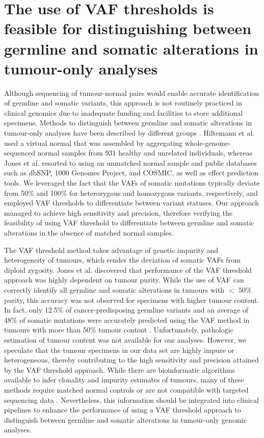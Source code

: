 \section{The use of VAF thresholds is feasible for distinguishing between germline and somatic alterations in tumour-only analyses}
\label{sec:TheuseofVAFthresholdsisfeasiblefordistinguishingbetweengermlineandsomaticalterationsintumour-onlyanalyses}

Although sequencing of tumour-normal pairs would enable accurate identification of germline and somatic variants, this approach is not routinely practiced in clinical genomics due to inadequate funding and facilities to store additional specimens. Methods to distinguish between germline and somatic alterations in tumour-only analyses have been described by different groups \cite{Hiltemann2015, Jones2015a, Garofalo2016}. Hiltemann et al. \cite{Hiltemann2015} used a virtual normal that was assembled by aggregating whole-genome-sequenced normal samples from 931 healthy and unrelated individuals, whereas Jones et al. \cite{Jones2015a} resorted to using an unmatched normal sample and public databases such as dbSNP, 1000 Genomes Project, and COSMIC, as well as effect prediction tools. We leveraged the fact that the VAFs of somatic mutations typically deviate from 50\% and 100\% for heterozygous and homozygous variants, respectively, and employed VAF thresholds to differentiate between variant statuses. Our approach managed to achieve high sensitivity and precision, therefore verifying the feasibility of using VAF threshold to differentiate between germline and somatic alterations in the absence of matched normal samples.

The VAF threshold method takes advantage of genetic impurity and heterogeneity of tumours, which render the deviation of somatic VAFs from diploid zygosity. Jones et al. \cite{Jones2015a} discovered that performance of the VAF threshold approach was highly dependent on tumour purity. While the use of VAF can correctly identify all germline and somatic alterations in tumours with $<$ 50\% purity, this accuracy was not observed for specimens with higher tumour content. In fact, only 12.5\% of cancer-predisposing germline variants and an average of 48\% of somatic mutations were accurately predicted using the VAF method in tumours with more than 50\% tumour content \cite{Jones2015a}. Unfortunately, pathologic estimation of tumour content was not available for our analyses. However, we speculate that the tumour specimens in our data set are highly impure or heterogeneous, thereby contributing to the high sensitivity and precision attained by the VAF threshold approach. While there are bioinformatic algorithms available to infer clonality and impurity estimates of tumours, many of these methods require matched normal controls or are not compatible with targeted sequencing data \cite{Yadav2015}. Nevertheless, this information should be integrated into clinical pipelines to enhance the performance of using a VAF threshold approach to distinguish between germline and somatic alterations in tumour-only genomic analyses.

